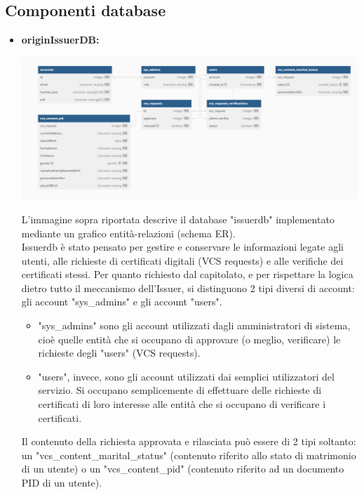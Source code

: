 \subsection{Componenti database}
\begin{itemize}
    \item \textbf{originIssuerDB:}\\
    \begin{center}
        \includegraphics[scale = 0.3]{./res/img/issuerdb.png}
      \end{center}
    L'immagine sopra riportata descrive il database "issuerdb" implementato mediante un grafico entità-relazioni (schema ER).\\
    Issuerdb è stato pensato per gestire e conservare le informazioni legate agli utenti, alle richieste di certificati digitali (VCS requests) e alle verifiche dei certificati stessi.
    Per quanto richiesto dal capitolato, e per rispettare la logica dietro tutto il meccanismo dell'Issuer, si distinguono 2 tipi diversi di account: gli account "sys\_admins" e gli account "users".\\
    \begin{itemize}
    \item "sys\_admins" sono gli account utilizzati dagli amministratori di sistema, cioè quelle entità che si occupano di approvare (o meglio, verificare) le richieste degli "users" (VCS requests).\\
    \item "users", invece, sono gli account utilizzati dai semplici utilizzatori del servizio. Si occupano semplicemente di effettuare delle richieste di certificati di loro interesse alle entità che si occupano di verificare i certificati.\\
    \end{itemize}
    Il contenuto della richiesta approvata e rilasciata può essere di 2 tipi soltanto: un "vcs\_content\_marital\_status" (contenuto riferito allo stato di matrimonio di un utente) o un "vcs\_content\_pid" (contenuto riferito ad un documento PID di un utente).\\





\end{itemize}
